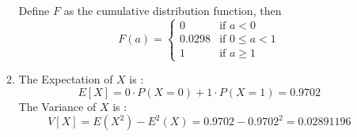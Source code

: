 \documentclass{article}
\begin{document}
\begin{enumerate}
\begin{enumerate}
            Define $F$ as the cumulative distribution function, then 
            $$
                F(a) = \begin{cases}
                    0       & \textrm{if } a < 0 \\
                    0.0298  & \textrm{if } 0 \leq a < 1 \\
                    1       & \textrm{if } a \geq 1 
                \end{cases}
            $$
            
            \item  The Expectation of $X$ is : $$ E[X] = 0 \cdot P(X=0) + 1 \cdot P(X=1) = 0.9702 $$
            The Variance of $X$ is : $$ V[X] = E(X^2) - E^2(X) = 0.9702 - 0.9702^2 = 0.02891196 $$
            
        \end{enumerate}
\end{enumerate}
\end{document}
